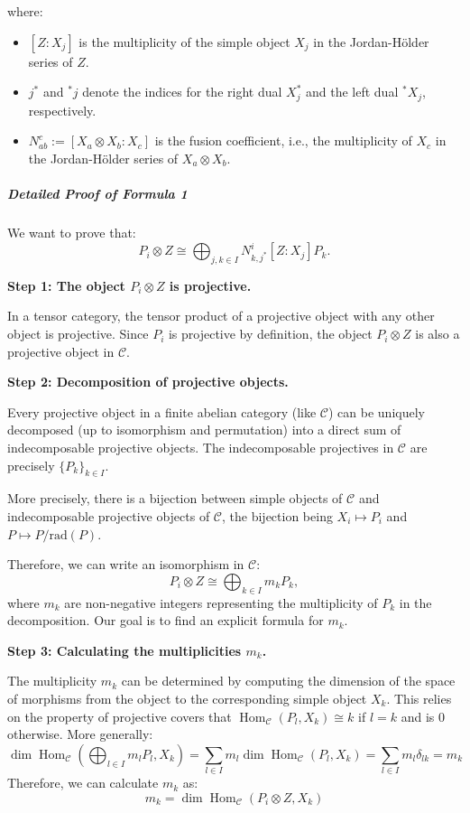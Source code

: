 \documentclass[11pt]{article}
\theoremstyle{definition}
\begin{document}
where:
\begin{itemize}
    \item \( [Z:X_j] \) is the multiplicity of the simple object \( X_j \) in the Jordan-H\"older series of \( Z \).
    \item \( j^* \) and \( {}^*j \) denote the indices for the right dual \( X_j^* \) and the left dual \( {}^*X_j \), respectively.
    \item \( N_{ab}^c := [X_a \otimes X_b : X_c] \) is the fusion coefficient, i.e., the multiplicity of \( X_c \) in the Jordan-H\"older series of \( X_a \otimes X_b \).
\end{itemize}

\subparagraph*{Detailed Proof of Formula 1}
We want to prove that:
\[
P_i \otimes Z \cong \bigoplus_{j,k \in I} N_{k,j^*}^i [Z:X_j] P_k.
\]

\textbf{Step 1: The object \( P_i \otimes Z \) is projective.}

In a tensor category, the tensor product of a projective object with any other object is projective. Since \( P_i \) is projective by definition, the object \( P_i \otimes Z \) is also a projective object in \( \mathcal{C} \).

\textbf{Step 2: Decomposition of projective objects.}

Every projective object in a finite abelian category (like \( \mathcal{C} \)) can be uniquely decomposed (up to isomorphism and permutation) into a direct sum of indecomposable projective objects. The indecomposable projectives in \( \mathcal{C} \) are precisely \( \{P_k\}_{k \in I} \).

More precisely, there is a bijection between simple objects of \( \mathcal{C} \) and indecomposable projective objects of \( \mathcal{C} \), the bijection being \( X_i \mapsto P_i \) and \( P \mapsto P/\mathrm{rad}(P) \).

Therefore, we can write an isomorphism in \( \mathcal{C} \):
\[
P_i \otimes Z \cong \bigoplus_{k \in I} m_k P_k,
\]
where \( m_k \) are non-negative integers representing the multiplicity of \( P_k \) in the decomposition. Our goal is to find an explicit formula for \( m_k \).

\textbf{Step 3: Calculating the multiplicities \( m_k \).}

The multiplicity \( m_k \) can be determined by computing the dimension of the space of morphisms from the object to the corresponding simple object \( X_k \). This relies on the property of projective covers that \( \operatorname{Hom}_{\mathcal{C}}(P_l, X_k) \cong k \) if \( l=k \) and is 0 otherwise. More generally:
\[
\operatorname{dim} \operatorname{Hom}_{\mathcal{C}}\left(\bigoplus_{l \in I} m_l P_l, X_k\right) = \sum_{l \in I} m_l \operatorname{dim} \operatorname{Hom}_{\mathcal{C}}(P_l, X_k) = \sum_{l \in I} m_l \delta_{lk} = m_k
\]
Therefore, we can calculate \( m_k \) as:
\[
m_k = \operatorname{dim} \operatorname{Hom}_{\mathcal{C}}(P_i \otimes Z, X_k)
\]
\end{document}
